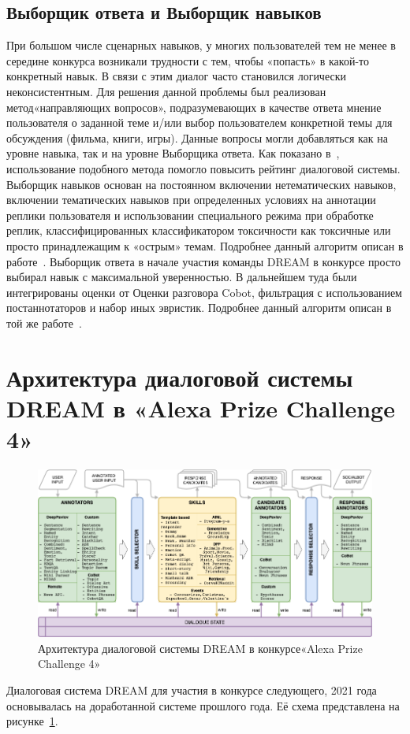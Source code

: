 \subsection{Выборщик ответа и Выборщик навыков}

При большом числе сценарных навыков, у многих пользователей тем не менее в середине конкурса возникали трудности с тем, чтобы «попасть» в какой-то конкретный навык. В связи с этим диалог часто становился логически неконсистентным. Для решения данной проблемы был реализован метод«направляющих вопросов», подразумевающих в качестве ответа мнение пользователя о заданной теме и/или выбор пользователем конкретной темы для обсуждения (фильма, книги, игры). Данные вопросы могли добавляться как на уровне навыка, так и на уровне Выборщика ответа. Как показано в~\cite{dream1}, использование подобного метода помогло повысить рейтинг диалоговой системы.
Выборщик навыков основан на постоянном включении нетематических навыков, включении тематических навыков при определенных условиях на аннотации реплики пользователя и использовании специального режима при обработке реплик, классифицированных классификатором токсичности как токсичные или просто принадлежащим к «острым» темам. Подробнее данный алгоритм описан в работе~\cite{dilya_thesis}.
Выборщик ответа в начале участия команды {DREAM} в конкурсе просто выбирал навык с максимальной уверенностью. В дальнейшем туда были интегрированы оценки от Оценки разговора Cobot, фильтрация с использованием постаннотаторов и набор иных эвристик. Подробнее данный алгоритм описан в той же работе~\cite{dilya_thesis}.

\section{Архитектура диалоговой системы {DREAM} в  «Alexa Prize Challenge 4»}


\begin{figure}[ht]
  \includegraphics[width=\textwidth]{images/Alexa2_.png}
  \caption{Архитектура диалоговой системы {DREAM} в конкурсе«Alexa Prize Challenge 4»}\label{fig:Alexa2}
\end{figure}
Диалоговая система {DREAM} для участия в конкурсе следующего, 2021 года основывалась на доработанной системе прошлого года. Её схема представлена на рисунке~\ref{fig:Alexa2}.



